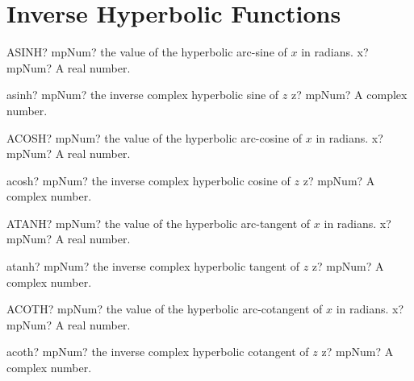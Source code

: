\documentclass[12pt,a4paper,openany]{book}
\begin{document}
\section{Inverse Hyperbolic Functions}

\begin{mpFunctionsExtract}
\mpWorksheetFunctionOneNotImplemented
{ASINH? mpNum? the value of the hyperbolic arc-sine  of $x$ in radians.}
{x? mpNum? A real number.}
\end{mpFunctionsExtract}

\begin{mpFunctionsExtract}
\mpFunctionOne
{asinh? mpNum? the inverse complex hyperbolic sine of $z$}
{z? mpNum? A complex number.}
\end{mpFunctionsExtract}

\begin{mpFunctionsExtract}
\mpWorksheetFunctionOneNotImplemented
{ACOSH? mpNum? the value of the hyperbolic arc-cosine  of $x$ in radians.}
{x? mpNum? A real number.}
\end{mpFunctionsExtract}

\begin{mpFunctionsExtract}
\mpFunctionOne
{acosh? mpNum? the inverse complex hyperbolic cosine of $z$}
{z? mpNum? A complex number.}
\end{mpFunctionsExtract}

\begin{mpFunctionsExtract}
\mpWorksheetFunctionOneNotImplemented
{ATANH? mpNum? the value of the hyperbolic arc-tangent  of $x$ in radians.}
{x? mpNum? A real number.}
\end{mpFunctionsExtract}

\begin{mpFunctionsExtract}
\mpFunctionOne
{atanh? mpNum? the inverse complex hyperbolic tangent of $z$}
{z? mpNum? A complex number.}
\end{mpFunctionsExtract}

\begin{mpFunctionsExtract}
\mpWorksheetFunctionOneNotImplemented
{ACOTH? mpNum? the value of the hyperbolic arc-cotangent  of $x$ in radians.}
{x? mpNum? A real number.}
\end{mpFunctionsExtract}

\begin{mpFunctionsExtract}
\mpFunctionOne
{acoth? mpNum? the inverse complex hyperbolic cotangent of $z$}
{z? mpNum? A complex number.}
\end{mpFunctionsExtract}
\end{document}
